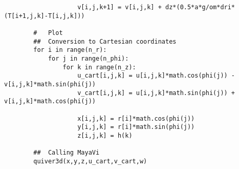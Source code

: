 \documentclass[12pt, a4paper]{article} %
\begin{document}
\begin{lstlisting}
		            v[i,j,k+1] = v[i,j,k] + dz*(0.5*a*g/om*dri*(T[i+1,j,k]-T[i,j,k]))
		
		#	Plot
		##	Conversion to Cartesian coordinates
		for i in range(n_r):
		    for j in range(n_phi):
		        for k in range(n_z):
		            u_cart[i,j,k] = u[i,j,k]*math.cos(phi(j)) - v[i,j,k]*math.sin(phi(j))
		            v_cart[i,j,k] = u[i,j,k]*math.sin(phi(j)) + v[i,j,k]*math.cos(phi(j))
		
		            x[i,j,k] = r[i]*math.cos(phi(j))
		            y[i,j,k] = r[i]*math.sin(phi(j))
		            z[i,j,k] = h(k)
		
		##	Calling MayaVi
		quiver3d(x,y,z,u_cart,v_cart,w)
		
		\end{lstlisting}
	
	
\pagebreak
\end{document}
